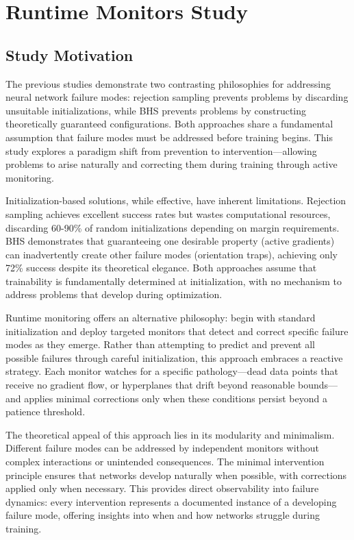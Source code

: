 \section{Runtime Monitors Study}
\label{sec:relu1-monitors}


\subsection*{Study Motivation}

The previous studies demonstrate two contrasting philosophies for addressing neural network failure modes: rejection sampling prevents problems by discarding unsuitable initializations, while BHS prevents problems by constructing theoretically guaranteed configurations. Both approaches share a fundamental assumption that failure modes must be addressed before training begins. This study explores a paradigm shift from prevention to intervention—allowing problems to arise naturally and correcting them during training through active monitoring.

Initialization-based solutions, while effective, have inherent limitations. Rejection sampling achieves excellent success rates but wastes computational resources, discarding 60-90\% of random initializations depending on margin requirements. BHS demonstrates that guaranteeing one desirable property (active gradients) can inadvertently create other failure modes (orientation traps), achieving only 72\% success despite its theoretical elegance. Both approaches assume that trainability is fundamentally determined at initialization, with no mechanism to address problems that develop during optimization.

Runtime monitoring offers an alternative philosophy: begin with standard initialization and deploy targeted monitors that detect and correct specific failure modes as they emerge. Rather than attempting to predict and prevent all possible failures through careful initialization, this approach embraces a reactive strategy. Each monitor watches for a specific pathology—dead data points that receive no gradient flow, or hyperplanes that drift beyond reasonable bounds—and applies minimal corrections only when these conditions persist beyond a patience threshold.

The theoretical appeal of this approach lies in its modularity and minimalism. Different failure modes can be addressed by independent monitors without complex interactions or unintended consequences. The minimal intervention principle ensures that networks develop naturally when possible, with corrections applied only when necessary. This provides direct observability into failure dynamics: every intervention represents a documented instance of a developing failure mode, offering insights into when and how networks struggle during training.

